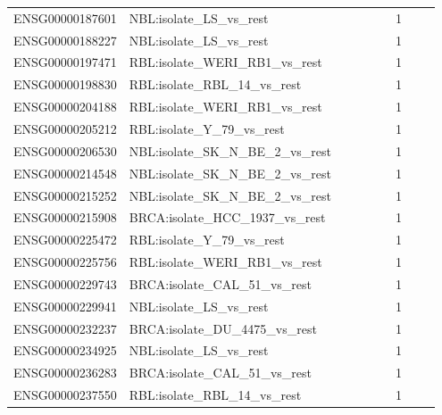 \begin{landscape}
{\begin{longtable}{p{0.18\linewidth}p{0.65\linewidth}p{0.12\linewidth}}
ENSG00000187601 & NBL:isolate\_\allowbreak{}LS\_\allowbreak{}vs\_\allowbreak{}rest & 1 \\
ENSG00000188227 & NBL:isolate\_\allowbreak{}LS\_\allowbreak{}vs\_\allowbreak{}rest & 1 \\
ENSG00000197471 & RBL:isolate\_\allowbreak{}WERI\_\allowbreak{}RB1\_\allowbreak{}vs\_\allowbreak{}rest & 1 \\
ENSG00000198830 & RBL:isolate\_\allowbreak{}RBL\_\allowbreak{}14\_\allowbreak{}vs\_\allowbreak{}rest & 1 \\
ENSG00000204188 & RBL:isolate\_\allowbreak{}WERI\_\allowbreak{}RB1\_\allowbreak{}vs\_\allowbreak{}rest & 1 \\
ENSG00000205212 & RBL:isolate\_\allowbreak{}Y\_\allowbreak{}79\_\allowbreak{}vs\_\allowbreak{}rest & 1 \\
ENSG00000206530 & NBL:isolate\_\allowbreak{}SK\_\allowbreak{}N\_\allowbreak{}BE\_\allowbreak{}2\_\allowbreak{}vs\_\allowbreak{}rest & 1 \\
ENSG00000214548 & NBL:isolate\_\allowbreak{}SK\_\allowbreak{}N\_\allowbreak{}BE\_\allowbreak{}2\_\allowbreak{}vs\_\allowbreak{}rest & 1 \\
ENSG00000215252 & NBL:isolate\_\allowbreak{}SK\_\allowbreak{}N\_\allowbreak{}BE\_\allowbreak{}2\_\allowbreak{}vs\_\allowbreak{}rest & 1 \\
ENSG00000215908 & BRCA:isolate\_\allowbreak{}HCC\_\allowbreak{}1937\_\allowbreak{}vs\_\allowbreak{}rest & 1 \\
ENSG00000225472 & RBL:isolate\_\allowbreak{}Y\_\allowbreak{}79\_\allowbreak{}vs\_\allowbreak{}rest & 1 \\
ENSG00000225756 & RBL:isolate\_\allowbreak{}WERI\_\allowbreak{}RB1\_\allowbreak{}vs\_\allowbreak{}rest & 1 \\
ENSG00000229743 & BRCA:isolate\_\allowbreak{}CAL\_\allowbreak{}51\_\allowbreak{}vs\_\allowbreak{}rest & 1 \\
ENSG00000229941 & NBL:isolate\_\allowbreak{}LS\_\allowbreak{}vs\_\allowbreak{}rest & 1 \\
ENSG00000232237 & BRCA:isolate\_\allowbreak{}DU\_\allowbreak{}4475\_\allowbreak{}vs\_\allowbreak{}rest & 1 \\
ENSG00000234925 & NBL:isolate\_\allowbreak{}LS\_\allowbreak{}vs\_\allowbreak{}rest & 1 \\
ENSG00000236283 & BRCA:isolate\_\allowbreak{}CAL\_\allowbreak{}51\_\allowbreak{}vs\_\allowbreak{}rest & 1 \\
ENSG00000237550 & RBL:isolate\_\allowbreak{}RBL\_\allowbreak{}14\_\allowbreak{}vs\_\allowbreak{}rest & 1 \\

\end{longtable}}
\end{landscape}
